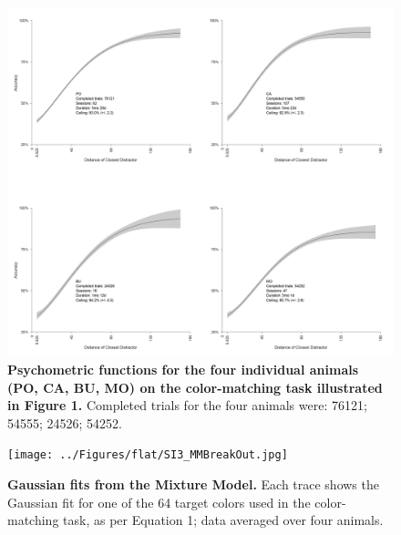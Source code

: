 \begin{figure}
    \centering
    \begin{fullwidth}
    \includegraphics[width=\textwidth+4cm]{../Figures/flat/SI2_psychometric.jpg}
    \caption{\textbf{Psychometric functions for the four individual animals (PO, CA, BU, MO) on the color-matching task illustrated in Figure 1.}
    Completed trials for the four animals were: 76121; 54555; 24526; 54252.
    } 
    \label{fig:IndiDiff}
    \end{fullwidth}
\end{figure}

\begin{figure}
    \centering
    \begin{fullwidth}
    \texttt{[image: ../Figures/flat/SI3\_MMBreakOut.jpg]}
    \caption{\textbf{Gaussian fits from the Mixture Model.}
    Each trace shows the Gaussian fit for one of the 64 target colors used in the color-matching task, as per Equation 1; data averaged over four animals.
    } 
    \label{fig:MMBreakOut}
    \end{fullwidth}
\end{figure}


